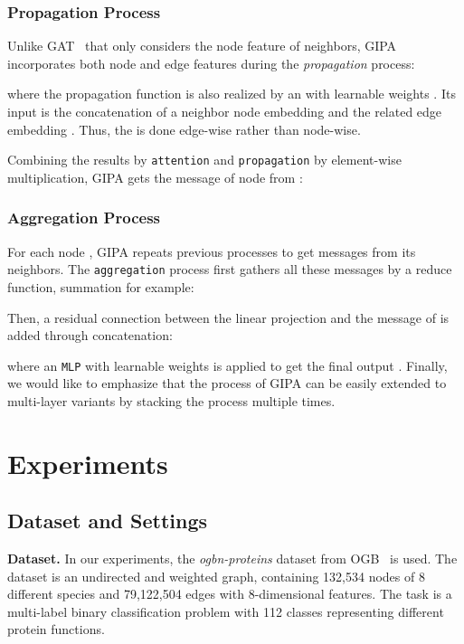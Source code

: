 \documentclass[sigconf]{acmart}
\newcommand{\model}{GIPA\xspace}
\begin{document}
\subsubsection{Propagation Process}

Unlike GAT~\cite{velivckovic2017graph} that only considers the node feature of neighbors, \model incorporates both node and edge features during the \textit{propagation} process:

\noindent where the propagation function  is also realized by an  with learnable weights . Its input is the concatenation of a neighbor node embedding  and the related edge embedding . Thus, the  is done edge-wise rather than node-wise. 

Combining the results by \texttt{attention} and \texttt{propagation} by element-wise multiplication, \model gets the message  of node  from :


\subsubsection{Aggregation Process}

For each node , \model repeats previous processes to get messages from its neighbors. The \texttt{aggregation} process first gathers all these messages by a reduce function, summation for example:



\noindent Then, a residual connection between the linear projection  and the message of  is added through concatenation: 





\noindent where an \texttt{MLP} with learnable weights  is applied to get the final output . 
Finally, we would like to emphasize that the process of \model can be easily extended to multi-layer variants by stacking the process multiple times. 
\section{Experiments}
\label{sec:exp}
\subsection{Dataset and Settings}

\textbf{Dataset.} In our experiments, the \textit{ogbn-proteins} dataset from OGB~\cite{hu2020open} is used. The dataset is an undirected and weighted graph, containing 132,534 nodes of 8 different species and 79,122,504 edges with 8-dimensional features. The task is a multi-label binary classification problem with 112 classes representing different protein functions. 
\end{document}
